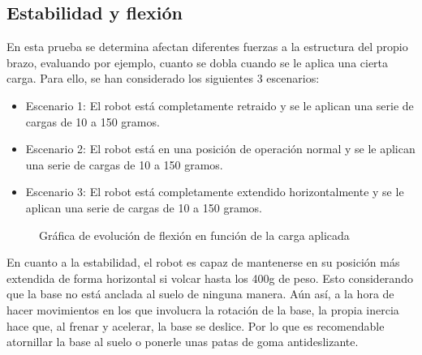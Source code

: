 \subsection{Estabilidad y flexión}
\noindent En esta prueba se determina afectan diferentes fuerzas a la estructura del propio brazo, evaluando por ejemplo, cuanto se dobla 
cuando se le aplica una cierta carga.
Para ello, se han considerado los siguientes 3 escenarios:
\begin{itemize}
    \item Escenario 1: El robot está completamente retraido y se le aplican una serie de cargas de 10 a 150 gramos.
    \item Escenario 2: El robot está en una posición de operación normal y se le aplican una serie de cargas de 10 a 150 gramos.
    \item Escenario 3: El robot está completamente extendido horizontalmente y se le aplican una serie de cargas de 10 a 150 gramos.
\end{itemize}

\begin{figure} [ht!]
    \centering
    \caption{Gráfica de evolución de flexión en función de la carga aplicada}
    \label{fig:grafica-flexion}
  \end{figure}
En cuanto a la estabilidad, el robot es capaz de mantenerse en su posición más extendida de forma horizontal si volcar hasta los 400g 
de peso. Esto considerando que la base no está anclada al suelo de ninguna manera. Aún así, a la hora de hacer movimientos en los que involucra 
la rotación de la base, la propia inercia hace que, al frenar y acelerar, la base se deslice. Por lo que es recomendable atornillar la base al 
suelo o ponerle unas patas de goma antideslizante. 

